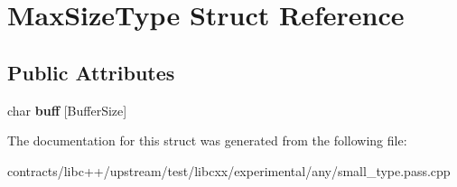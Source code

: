 \hypertarget{struct_max_size_type}{}\section{Max\+Size\+Type Struct Reference}
\label{struct_max_size_type}
\subsection*{Public Attributes}
\begin{DoxyCompactItemize}
\item 
\mbox{\label{struct_max_size_type_a5391d8a0b4c762b4847475bea428860d}} 
char {\bfseries buff} \mbox{[}Buffer\+Size\mbox{]}
\end{DoxyCompactItemize}


The documentation for this struct was generated from the following file\+:\begin{DoxyCompactItemize}
\item 
contracts/libc++/upstream/test/libcxx/experimental/any/small\+\_\+type.\+pass.\+cpp\end{DoxyCompactItemize}
